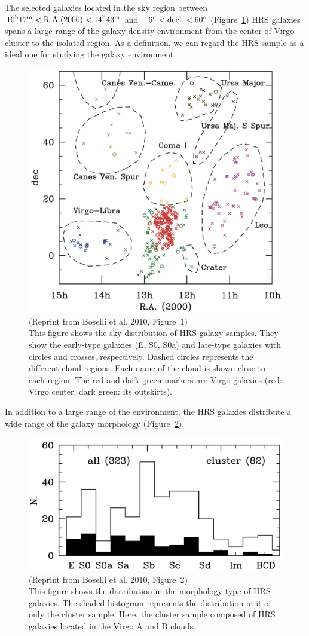 The selected galaxies located in the sky region between $10^{\mathrm{h}}17^{\mathrm{m}}< \mathrm{R.A.}(2000) < 14^{\mathrm{h}}43^{\mathrm{m}}$ and $-6^{\circ} < \mathrm{decl.} < 60^{\circ}$ (Figure~\ref{fig:Boselli2010_figure1})
HRS galaxies spans a large range of the galaxy density environment from the center of Virgo cluster to the isolated region.
As a definition, we can regard the HRS sample as a ideal one for studying the galaxy environment.

\begin{figure}[htbp]
	\centering
	\includegraphics[width=.6\linewidth]{Chapter_3/Figures/Boselli2010_Figure1.png}
    \caption[Reprint from Boselli et al. 2010 (Figure~1)]{\label{fig:Boselli2010_figure1}
        (Reprint from Boselli et al. 2010, Figure~1)\\
        This figure shows the sky distribution of HRS galaxy samples.
        They show the early-type galaxies (E, S0, S0a) and late-type galaxies with circles and crosses, respectively.
        Dashed circles represents the different cloud regions. Each name of the cloud is shown close to each region.
        The red and dark green markers are Virgo galaxies (red: Virgo center, dark green: its outskirts).
    }
\end{figure}

In addition to a large range of the environment, the HRS galaxies distribute a wide range of the galaxy morphology (Figure~\ref{fig:Boselli2010_figure2}).

\begin{figure}[htbp]
	\centering
	\includegraphics[width=.6\linewidth]{Chapter_3/Figures/Boselli2010_Figure2.png}
    \caption[Reprint from Boselli et al. 2010 (Figure~2)]{\label{fig:Boselli2010_figure2}
        (Reprint from Boselli et al. 2010, Figure~2)\\
        This figure shows the distribution in the morphology-type of HRS galaxies.
        The shaded histogram represents the distribution in it of only the cluster sample.
        Here, the cluster sample composed of HRS galaxies located in the Virgo A and B clouds.
    }
\end{figure}

